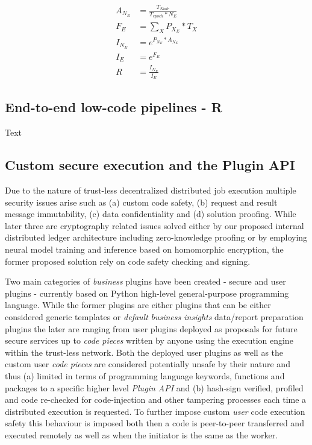 \documentclass{article}
\begin{document}
\begin{align}
A_{N_{E}} &= \frac {T_{Node}}{T_{epoch} * N_E}\label{eqr:1}\\
F_{E} &=\sum_{X}{P_{X_E} * T_{X}}\label{eqr:2}\\
I_{N_E} &= e^{P_{N_E} * A_{N_{E}}}\label{eqr:3}\\
I_{E} &= e^{F_{E}}\label{eqr:4}\\
R &= \frac{I_{N_E}}{I_{E}} \label{eqr:5}
\end{align}



\subsection{End-to-end low-code pipelines - R}
Text
\subsection{Custom secure execution and the Plugin API}

Due to the nature of trust-less decentralized distributed job execution multiple security issues arise such as (a) custom code safety, (b) request and result message immutability, (c) data confidentiality and (d) solution proofing. While later three are cryptography related issues solved either by our proposed internal distributed ledger architecture including zero-knowledge proofing or by employing neural model training and inference based on homomorphic encryption, the former proposed solution rely on code safety checking and signing.

Two main categories of \emph{business} plugins have been created - secure and user plugins - currently based on Python\cite{vanrossum1995python} high-level general-purpose programming language. While the former plugins are either plugins that can be either considered generic templates or \emph{default} \emph{business insights} data/report preparation plugins the later are ranging from user plugins deployed as proposals for future secure services up to \emph{code pieces} written by anyone using the execution engine within the trust-less network. Both the deployed user plugins as well as the custom user \emph{code pieces} are considered potentially unsafe by their nature and thus (a) limited in terms of programming language keywords, functions and packages to a specific higher level \emph{Plugin API} and (b) hash-sign verified, profiled and code re-checked for code-injection and other tampering processes each time a distributed execution is requested. To further impose custom \emph{user} code execution safety this behaviour is imposed both then a code is peer-to-peer transferred and executed remotely as well as when the initiator is the same as the worker.
\end{document}
